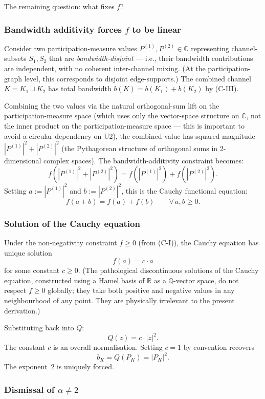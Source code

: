 \documentclass[11pt,a4paper]{article}
\begin{document}
The remaining question: what fixes $f$?

\subsubsection{Bandwidth additivity forces $f$ to be linear}

Consider two participation-measure values $P^{(1)}, P^{(2)} \in \mathbb{C}$ representing channel-subsets $S_1, S_2$ that are \emph{bandwidth-disjoint} --- i.e., their bandwidth contributions are independent, with no coherent inter-channel mixing. (At the participation-graph level, this corresponds to disjoint edge-supports.) The combined channel $K = K_1 \sqcup K_2$ has total bandwidth $b(K) = b(K_1) + b(K_2)$ by (C-III).

Combining the two values via the natural orthogonal-sum lift on the participation-measure space (which uses only the vector-space structure on $\mathbb{C}$, not the inner product on the participation-measure space --- this is important to avoid a circular dependency on U2), the combined value has squared magnitude $|P^{(1)}|^2 + |P^{(2)}|^2$ (the Pythagorean structure of orthogonal sums in 2-dimensional complex spaces). The bandwidth-additivity constraint becomes:
\[
f(|P^{(1)}|^2 + |P^{(2)}|^2) = f(|P^{(1)}|^2) + f(|P^{(2)}|^2).
\]
Setting $a := |P^{(1)}|^2$ and $b := |P^{(2)}|^2$, this is the Cauchy functional equation:
\[
f(a + b) = f(a) + f(b) \qquad \forall\, a, b \geq 0.
\]

\subsubsection{Solution of the Cauchy equation}

Under the non-negativity constraint $f \geq 0$ (from (C-I)), the Cauchy equation has unique solution
\[
f(a) = c \cdot a
\]
for some constant $c \geq 0$. (The pathological discontinuous solutions of the Cauchy equation, constructed using a Hamel basis of $\mathbb{R}$ as a $\mathbb{Q}$-vector space, do not respect $f \geq 0$ globally; they take both positive and negative values in any neighbourhood of any point. They are physically irrelevant to the present derivation.)

Substituting back into $Q$:
\[
Q(z) = c \cdot |z|^2.
\]
The constant $c$ is an overall normalisation. Setting $c = 1$ by convention recovers
\[
b_K = Q(P_K) = |P_K|^2.
\]
The exponent~2 is uniquely forced.

\subsubsection{Dismissal of $\alpha \neq 2$}\label{sec:F3-altexp}
\end{document}
